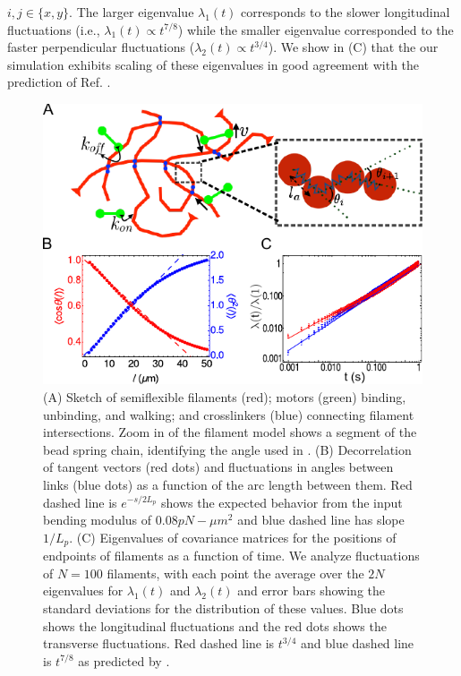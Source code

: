 \documentclass[12pt]{article}
\begin{document}
$i,j\in\{x,y\}$.
The larger eigenvalue $\lambda_1(t)$ corresponds to the slower longitudinal fluctuations
(i.e., $\lambda_1(t)\propto t^{7/8}$) while the smaller eigenvalue corresponded to the faster perpendicular fluctuations
($\lambda_2(t)\propto t^{3/4}$). We show  in (C) that the our simulation exhibits scaling of these eigenvalues in good agreement with the prediction of Ref. \cite{everaers1999}.
\begin{figure}[H] 
  \centering
   \includegraphics[scale=1]{figs/filament/pl_fig.pdf}
  \caption{\label{fig:filament}
 (A) Sketch of semiflexible filaments (red); motors (green) binding, unbinding, and walking; and crosslinkers (blue) connecting filament intersections. Zoom in of the filament model shows a segment of the bead spring chain, identifying the angle used in .
  (B) Decorrelation of tangent vectors (red dots) and fluctuations in angles between links (blue dots) 
  as a function of the arc length between them. Red dashed
  line is $e^{-s/2L_p}$ shows the expected behavior from the input bending modulus of $0.08 pN-\mu m^2$ and blue
  dashed line has slope $1/L_p$.
  (C) Eigenvalues of covariance matrices for the positions of endpoints of filaments as a function of time. We analyze fluctuations of $N=100$ filaments, with each point the average over the $2N$ eigenvalues for $\lambda_1(t)$ and $\lambda_2(t)$ and error bars showing the standard deviations for the
distribution of these values. Blue
  dots shows the longitudinal fluctuations and the red dots shows the transverse fluctuations. Red dashed line is
  $t^{3/4}$ and blue dashed line is $t^{7/8}$ as predicted by \cite{everaers1999}. 
}
\end{figure} 
\end{document}
